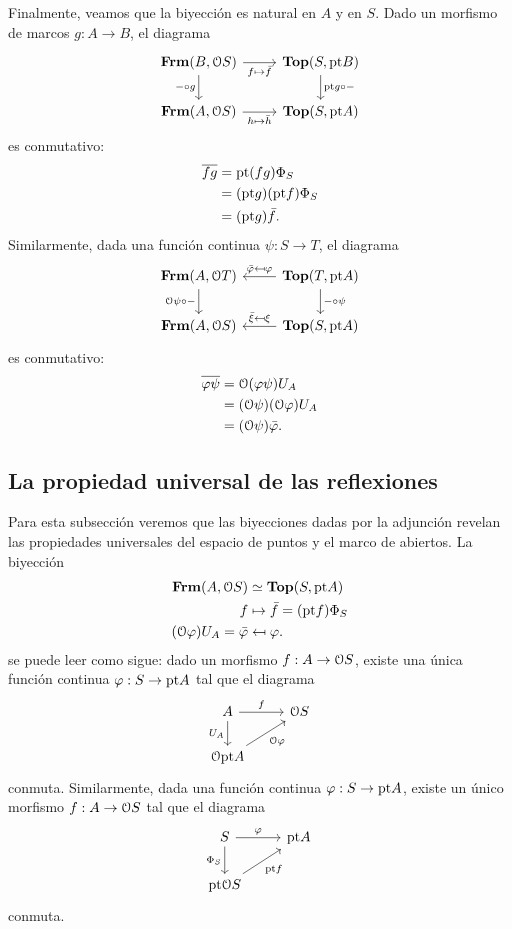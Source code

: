 \documentclass{comunicaciones}
\begin{document}
Finalmente, veamos que la biyección es natural en $A$ y en $S$.
Dado un morfismo de marcos $g:A\to B$, el diagrama
\[
    \begin{tikzcd}
        \Frm(B,\Cal OS) \ar[d,"{-}\circ g"'] \ar[r,"f\mapsto\bar f"']
        & \Top(S,\pt B)
        \ar[d,"\pt g\circ{-}"]
        \\
        \Frm(A,\Cal OS) \ar[r,"h\mapsto\bar h"']
        & \Top(S,\pt A)
    \end{tikzcd}
\]
es conmutativo:
\begin{align*}
    \overline{fg}
    &= \mathrm{pt}(f g)\Phi_S \\
    &= (\mathrm{pt} g)(\mathrm{pt} f)\Phi_S \\
    &= (\mathrm{pt} g)\bar f.
\end{align*}
Similarmente, dada una función continua $\psi:S\to T$,
el diagrama
\[
    \begin{tikzcd}
        \Frm(A,\Cal OT)
        \ar[d,"\Cal O\psi\circ{-}"']
        & \Top(T,\pt A) \ar[l,"\bar \phi\mapsfrom \phi"']
        \ar[d,"{-}\circ \psi"]
        \\
        \Frm(A,\Cal OS)
        & \Top(S,\pt A) \ar[l,"\bar \xi\mapsfrom \xi"']
    \end{tikzcd}
\]
es conmutativo:
\begin{align*}
    \overline{\varphi\psi}
    &= \mathcal{O}(\varphi\psi)U_A \\
    &= (\mathcal{O}\psi)(\mathcal{O}\varphi)U_A \\
    &= (\mathcal{O}\psi)\bar{\varphi}.
\end{align*}

\subsection{La propiedad universal de las reflexiones}

Para esta subsección veremos que las biyecciones dadas por la adjunción revelan las propiedades universales del espacio de puntos y el marco de abiertos.
La biyección
\begin{align*}
    \mathbf{Frm}(A,\mathcal{O}S) &\simeq \mathbf{Top}(S,\mathrm{pt} A) \\
    f &\mapsto \bar f = (\mathrm{pt} f)\Phi_S \\
    (\mathcal{O}\varphi)U_A = \bar{\varphi} &\mapsfrom \varphi.
\end{align*}
se puede leer como sigue:
dado un morfismo $f:A\to\mathcal{O}S$, existe una única función continua
$\varphi:S\to\mathrm{pt} A$ tal que el diagrama
\[
    \begin{tikzcd}
        A \ar[r,"f"] \ar[d,"U_A"'] & \Cal OS \\
        \Cal O\pt A \ar[ur,"\Cal O\phi"']
    \end{tikzcd}
\]
conmuta.
Similarmente, dada una función continua $\varphi:S\to\mathrm{pt} A$, existe
un único morfismo $f:A\to\mathcal{O}S$ tal que el diagrama
\[
    \begin{tikzcd}
        S \ar[r,"\phi"] \ar[d,"\Phi_S"'] & \pt A \\
        \pt\Cal OS \ar[ur,"\pt f"']
    \end{tikzcd}
\]
conmuta.
\end{document}
